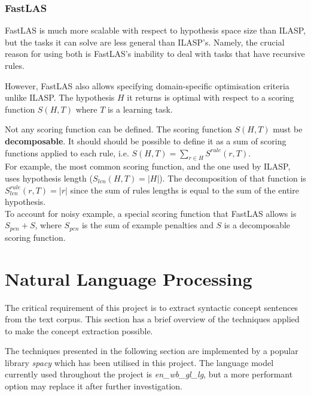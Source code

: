 \subsubsection{FastLAS}
\label{fastlas-background}

FastLAS is much more scalable with respect to hypothesis space size than ILASP, but the tasks it can solve are less general than ILASP's.
Namely, the crucial reason for using both is FastLAS's inability to deal with tasks that have recursive rules.

However, FastLAS also allows specifying domain-specific optimisation criteria unlike ILASP. 
The hypothesis $H$ it returns is optimal with respect to a scoring function $S(H, T)$ where $T$ is a learning task.

Not any scoring function can be defined.
The scoring function $S(H, T)$ must be \textbf{decomposable}.
It should should be possible to define it as a sum of scoring functions applied to each rule, i.e. $S(H, T) = \sum_{r \in H} S^{rule}(r, T)$. \\
For example, the most common scoring function, and the one used by ILASP, uses hypothesis length ($S_{len}(H, T) = |H|$).
The decomposition of that function is $S_{len}^{rule}(r, T) = |r|$ since the sum of rules lengths is equal to the sum of the entire hypothesis. \\

To account for noisy example, a special scoring function that FastLAS allows is $S_{pen} + S$, where $S_{pen}$ is the sum of example penalties and $S$ is a decomposable scoring function.


\section{Natural Language Processing}

The critical requirement of this project is to extract syntactic concept sentences from the text corpus.
This section has a brief overview of the techniques applied to make the concept extraction possible.

The techniques presented in the following section are implemented by a popular library \emph{spacy} \cite{RefWorks:RefID:24-spacy} which has been utilised in this project. 
The language model currently used throughout the project is \emph{en\_wb\_gl\_lg}, but a more performant option may replace it after further investigation.

